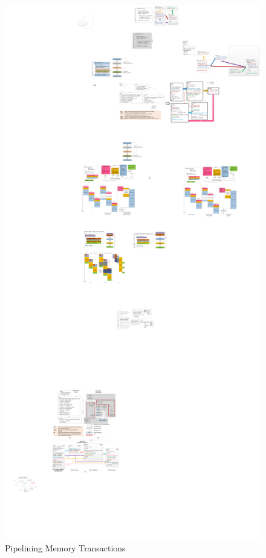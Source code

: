 \begin{figure}[htp]
\begin{center}
\includegraphics[width=0.8\linewidth]{chap3fig/memTrans.pdf}
\caption{Pipelining Memory Transactions 
\label{fig:memTrans}}
\end{center}
\end{figure}

